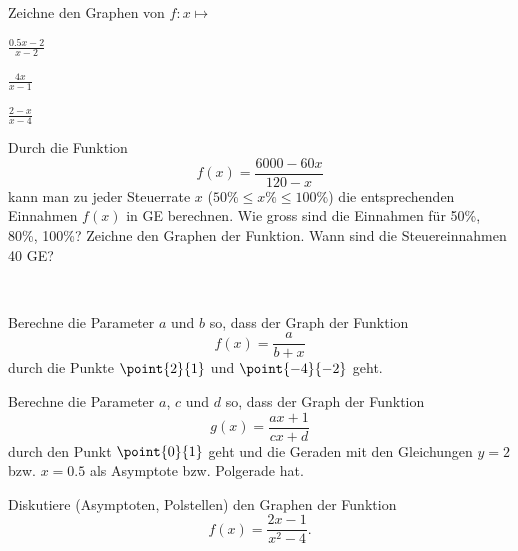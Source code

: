 \documentclass[%
11pt,%
twoside,%
titlepage,%
german,%
headsepline%
]{scrartcl}
\begin{document}
\begin{ueb}
Zeichne den Graphen von $f:x\mapsto$

\begin{minipage}{0.32\textwidth}
\begin{enumeratea}
\item $\frac{0.5x-2}{x-2}$
\end{enumeratea}
\end{minipage}
\begin{minipage}{0.32\textwidth}
\begin{enumeratea}
\addtocounter{enumi}{1}
\item $\frac{4x}{x-1}$
\end{enumeratea}
\end{minipage}
\begin{minipage}{0.32\textwidth}
\begin{enumeratea}
\addtocounter{enumi}{2}
\item $\frac{2-x}{x-4}$
\end{enumeratea}
\end{minipage} 
\end{ueb}

\begin{ueb}[Steuerrate]
Durch die Funktion
$$f(x)=\frac{6000-60x}{120-x}$$
kann man zu jeder Steuerrate $x$ ($50\%\leq x\%\leq100\%$) die entsprechenden Einnahmen $f(x)$ in GE berechnen. Wie gross sind die Einnahmen für 50\%, 80\%, 100\%? Zeichne den Graphen der Funktion. Wann sind die Steuereinnahmen 40 GE?
\end{ueb}

\begin{ueb}
\ \\[-2ex]
\begin{enumeratea}
\item Berechne die Parameter $a$ und $b$ so, dass der Graph der Funktion
$$f(x)=\frac{a}{b+x}$$
durch die Punkte $\point{2}{1}$ und $\point{-4}{-2}$ geht.
\item Berechne die Parameter $a$, $c$ und $d$ so, dass der Graph der Funktion
$$g(x)=\frac{ax+1}{cx+d}$$
durch den Punkt $\point{0}{1}$ geht und die Geraden mit den Gleichungen $y=2$ bzw. $x=0.5$ als Asymptote bzw. Polgerade hat.
\end{enumeratea}
\end{ueb}

\begin{ueb}[interpretiere]
Diskutiere (Asymptoten, Polstellen) den Graphen der Funktion
$$f(x)=\frac{2x-1}{x^2-4}.$$
\end{ueb}
\end{document}
